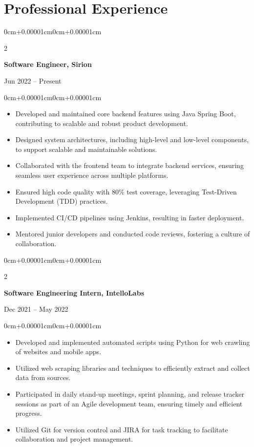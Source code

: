 \documentclass[10pt, letterpaper]{article}
\newenvironment{highlights}{
    \begin{itemize}[topsep=0.10cm,parsep=0.10cm,partopsep=0pt,itemsep=0pt,leftmargin=0cm+10pt]
}{
    \end{itemize}
}
\newenvironment{onecolentry}{
    \begin{adjustwidth}{0cm+0.00001cm}{0cm+0.00001cm}
}{
    \end{adjustwidth}
}
\newenvironment{twocolentry}[2][]{
    \onecolentry
    \def\secondColumn{#2}
    \setcolumnwidth{\fill, 4.5cm}
    \begin{paracol}{2}
}{
    \switchcolumn \raggedleft \secondColumn
    \end{paracol}
    \endonecolentry
}
\begin{document}
    \vspace{0.2cm}

    \section{Professional Experience}

    \begin{twocolentry}{Jun 2022 -- Present}
        \textbf{Software Engineer, Sirion}
    \end{twocolentry}
    \vspace{0.10cm}
    \begin{onecolentry}
        \begin{highlights}
            \item Developed and maintained core backend features using Java Spring Boot, contributing to scalable and robust product development.
            \item Designed system architectures, including high-level and low-level components, to support scalable and maintainable solutions.
            \item Collaborated with the frontend team to integrate backend services, ensuring seamless user experience across multiple platforms.
            \item Ensured high code quality with 80\% test coverage, leveraging Test-Driven Development (TDD) practices.
            \item Implemented CI/CD pipelines using Jenkins, resulting in faster deployment.
            \item Mentored junior developers and conducted code reviews, fostering a culture of collaboration.
        \end{highlights}
    \end{onecolentry}

    \vspace{0.2cm}

    \begin{twocolentry}{Dec 2021 -- May 2022}
        \textbf{Software Engineering Intern, IntelloLabs}
    \end{twocolentry}
    \vspace{0.10cm}
    \begin{onecolentry}
        \begin{highlights}
            \item Developed and implemented automated scripts using Python for web crawling of websites and mobile apps.
            \item Utilized web scraping libraries and techniques to efficiently extract and collect data from sources.
            \item Participated in daily stand-up meetings, sprint planning, and release tracker sessions as part of an Agile development team, ensuring timely and efficient progress.
            \item Utilized Git for version control and JIRA for task tracking to facilitate collaboration and project management.
        \end{highlights}
    \end{onecolentry}
\end{document}
